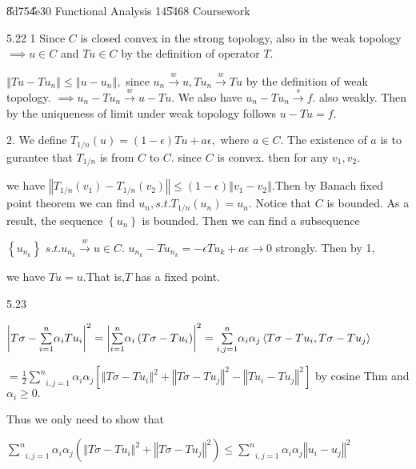 \documentclass{article}
\begin{document}
\bigskip \bigskip \bigskip \U{8d75}\U{4e30}\qquad \qquad
Functional Analysis 14\U{5468} Coursework

5.22 1 Since $C$ is closed convex in the strong topology, also in the weak
topology$\implies u\in C$ and $Tu\in C$ by the definition of operator $T.$

$\left\Vert Tu-Tu_{n}\right\Vert \leq \left\Vert u-u_{n}\right\Vert ,$ since 
$u_{n}\overset{w}{\rightarrow }u,Tu_{n}\overset{w}{\rightarrow }Tu$ by the
definition of weak topology. $\implies u_{n}-Tu_{n}\overset{w}{\rightarrow }%
u-Tu.$ We also have $u_{n}-Tu_{n}\overset{s}{\rightarrow }f.$ also weakly.
Then by the uniqueness of limit under weak topology follows $u-Tu=f.$

2. We define $T_{1/n}\left( u\right) =\left( 1-\epsilon \right) Tu+a\epsilon
,$ where $a\in C.$ The existence of $a$ is to gurantee that $T_{1/n}$ is
from $C$ to $C.$ since $C$ is convex. then for any $v_{1},v_{2}.$

we have $\left\Vert T_{1/n}\left( v_{1}\right) -T_{1/n}\left( v_{2}\right)
\right\Vert \leq \left( 1-\epsilon \right) \left\Vert v_{1}-v_{2}\right\Vert
.$Then by Banach fixed point theorem we can find $u_{n},s.t.T_{1/n}\left(
u_{n}\right) =u_{n}.$ Notice that $C$ is bounded. As a result, the sequence $%
\left\{ u_{n}\right\} $ is bounded. Then we can find a subsequence

$\left\{ u_{n_{k}}\right\} $ $s.t.u_{n_{k}}\overset{w}{\rightarrow }u\in C.$ 
$u_{n_{k}}-Tu_{n_{k}}=-\epsilon Tu_{k}+a\epsilon \rightarrow 0$ strongly.
Then by 1,

we have $Tu=u.$That is,$T$ has a fixed point.

5.23

$\left\vert T\sigma -\underset{i=1}{\overset{n}{\sum }}\alpha
_{i}Tu_{i}\right\vert ^{2}=\left\vert \underset{i=1}{\overset{n}{\sum }}%
\alpha _{i}\left( T\sigma -Tu_{i}\right) \right\vert ^{2}=\underset{i,j=1}{%
\overset{n}{\sum }}\alpha _{i}\alpha _{j}\left\langle T\sigma
-Tu_{i},T\sigma -Tu_{j}\right\rangle $

$=\frac{1}{2}\underset{i,j=1}{\overset{n}{\sum }}\alpha _{i}\alpha
_{j}[\left\Vert T\sigma -Tu_{i}\right\Vert ^{2}+\left\Vert T\sigma
-Tu_{j}\right\Vert ^{2}-\left\Vert Tu_{i}-Tu_{j}\right\Vert ^{2}]$ by cosine
Thm and $\alpha _{i}\geq 0.$

Thus we only need to show that 

$\underset{i,j=1}{\overset{n}{\sum }}\alpha _{i}\alpha _{j}\left( \left\Vert
T\sigma -Tu_{i}\right\Vert ^{2}+\left\Vert T\sigma -Tu_{j}\right\Vert
^{2}\right) \leq \underset{i,j=1}{\overset{n}{\sum }}\alpha _{i}\alpha
_{j}\left\Vert u_{i}-u_{j}\right\Vert ^{2}$
\end{document}

